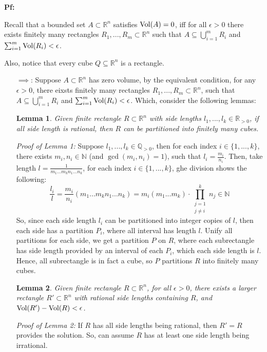 \documentclass{article}
\newtheorem{lemma}{Lemma}
\begin{document}
\textbf{Pf:}

Recall that a bounded set $A\subset\mathbb{R}^n$ satisfies $\textmd{Vol}(A)=0$, iff for all $\epsilon>0$ there exists finitely many rectangles $R_1,...,R_m\subset \mathbb{R}^n$ such that $A\subseteq \bigcup_{i=1}^{m}R_i$ and $\sum_{i=1}^{m}\textmd{Vol}(R_i)<\epsilon$. 

Also, notice that every cube $Q\subseteq\mathbb{R}^n$ is a rectangle.
\begin{itemize}
    \item[$\implies$:] Suppose $A\subset\mathbb{R}^n$ has zero volume, by the equivalent condition, for any $\epsilon>0$, there eixsts finitely many rectangles $R_1,...,R_m\subset\mathbb{R}^n$, such that $A\subseteq \bigcup_{i=1}^{m}R_i$ and $\sum_{i=1}^{m}\textmd{Vol}(R_i)<\epsilon$. Which, consider the following lemmas:

    \begin{lemma}
        Given finite rectangle $R\subset\mathbb{R}^n$ with side lengths $l_1,...,l_k\in\mathbb{R}_{>0}$, if all side length is rational, then $R$ can be partitioned into finitely many cubes.
    \end{lemma}
    \textit{Proof of Lemma 1:} Suppose $l_1,...,l_k\in\mathbb{Q}_{>0}$, then for each index $i\in\{1,...,k\}$, there exists $m_i,n_i\in\mathbb{N}$ (and $\gcd(m_i,n_i)=1$), such that $l_i=\frac{m_i}{n_i}$. Then, take length $l=\frac{1}{m_1...m_kn_1...n_k}$, for each index $i\in\{1,...,k\}$, ghe division shows the following:
    \begin{equation}
        \frac{l_i}{l} = \frac{m_i}{n_i}(m_1...m_kn_1...n_k) = m_i(m_1...m_k)\cdot \prod_{\substack{j=1\\j\neq i}}^{k}n_j \in\mathbb{N}
    \end{equation}
    So, since each side length $l_i$ can be partitioned into integer copies of $l$, then each side has a partition $P_i$, where all interval has length $l$. Unify all partitions for each side, we get a partition $P$ on $R$, where each subrectangle has side length provided by an interval of each $P_i$, which each side length is $l$. Hence, all subrectangle is in fact a cube, so $P$ partitions $R$ into finitely many cubes.

    \begin{lemma}
        Given finite rectangle $R\subset\mathbb{R}^n$, for all $\epsilon>0$, there exists a larger rectangle $R'\subset\mathbb{R}^n$ with rational side lengths containing $R$, and $\textmd{Vol}(R')-\textmd{Vol}(R)<\epsilon$.
    \end{lemma}
    \textit{Proof of Lemma 2:} If $R$ has all side lengths being rational, then $R'=R$ provides the solution. So, can assume $R$ has at least one side length being irrational.


\end{itemize}
\end{document}
